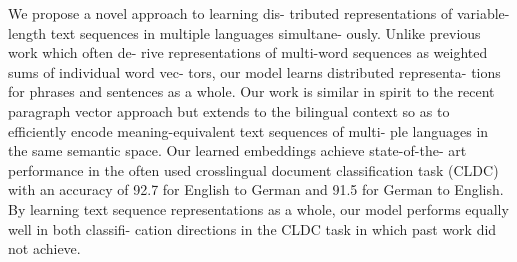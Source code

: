 We propose a novel approach to learning dis- tributed representations of variable-length text sequences in multiple languages simultane- ously. Unlike previous work which often de- rive representations of multi-word sequences as weighted sums of individual word vec- tors, our model learns distributed representa- tions for phrases and sentences as a whole. Our work is similar in spirit to the recent paragraph vector approach but extends to the bilingual context so as to efficiently encode meaning-equivalent text sequences of multi- ple languages in the same semantic space. Our learned embeddings achieve state-of-the- art performance in the often used crosslingual document classification task (CLDC) with an accuracy of 92.7 for English to German and 91.5 for German to English. By learning text sequence representations as a whole, our model performs equally well in both classifi- cation directions in the CLDC task in which past work did not achieve.
